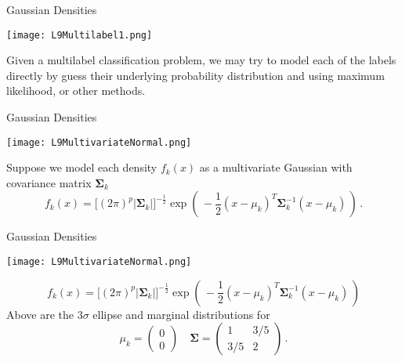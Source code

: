 \documentclass[10pt, table, dvipsnames,xcdraw, handout]{beamer}
\begin{document}
\begin{frame}[fragile]{Gaussian Densities}
  \begin{minipage}[t][0.5\textheight][t]{\textwidth}
	\centering \texttt{[image: L9Multilabel1.png]} 
  \end{minipage}
  \vfill
\begin{minipage}[t][0.5\textheight][t]{\textwidth}
Given a multilabel classification problem, we may try to model each of the labels directly by guess their underlying probability distribution and using maximum likelihood, or other methods. 
\end{minipage}
\end{frame}





\begin{frame}[fragile]{Gaussian Densities}
  \begin{minipage}[t][0.5\textheight][t]{\textwidth}
	\centering \texttt{[image: L9MultivariateNormal.png]} 
  \end{minipage}
  \vfill
\begin{minipage}[t][0.5\textheight][t]{\textwidth}
Suppose we model each density $f_k(x)$ as a multivariate Gaussian with covariance matrix $\mathbf{\Sigma}_k$
$$
f_k(x) = \big[(2\pi)^p |\mathbf{\Sigma}_k| \big]^{-\frac12}\exp\left(\,-\frac12(x-\mu_k)^T\mathbf{\Sigma}_k^{-1}(x-\mu_k)  \,\right)\,.
$$
\end{minipage}
\end{frame}



\begin{frame}[fragile]{Gaussian Densities}
  \begin{minipage}[t][0.5\textheight][t]{\textwidth}
	\centering \texttt{[image: L9MultivariateNormal.png]} 
  \end{minipage}
  \vfill
\begin{minipage}[t][0.5\textheight][t]{\textwidth}
$$
f_k(x) = \big[(2\pi)^p |\mathbf{\Sigma}_k| \big]^{-\frac12}\exp\left(\,-\frac12(x-\mu_k)^T\mathbf{\Sigma}_k^{-1}(x-\mu_k)  \,\right)
$$
Above are the $3\sigma$ ellipse and marginal distributions for
$$
\mu_k= 
\left(
\begin{matrix}
0\\0
\end{matrix}
\right)
\hspace{1em}
\mathbf{\Sigma} = 
\left(
\begin{matrix}
1&3/5\\
3/5&2
\end{matrix}
\right)\,.
$$
\end{minipage}
\end{frame}
\end{document}
